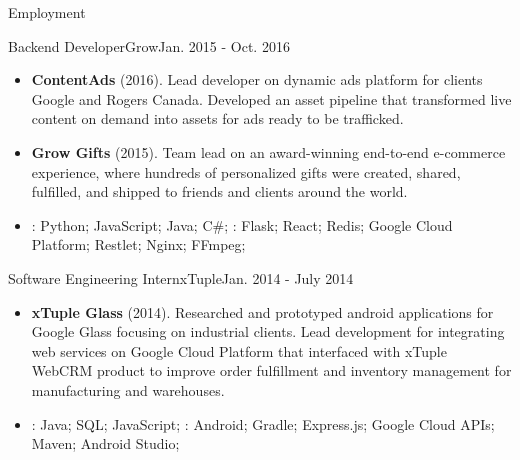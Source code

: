 \documentclass[]{mcdowellcv}
\begin{document}
\begin{cvsection}{Employment}
        \begin{cvsubsection}{Backend Developer}{Grow}{Jan. 2015 - Oct. 2016}
            \begin{itemize}
                \item \textbf{ContentAds} (2016). Lead developer on dynamic ads platform for clients Google and Rogers Canada. Developed an asset pipeline that transformed live content on demand into assets for ads ready to be trafficked.
            \end{itemize}
            \begin{itemize}
                \item \textbf{Grow Gifts} (2015). Team lead on an award-winning end-to-end e-commerce experience, where hundreds of personalized gifts were created, shared, fulfilled, and shipped to friends and clients around the world.
            \end{itemize}
            \begin{itemize}
                 \item {}: Python; JavaScript; Java; C\#; \newline
                : Flask; React; Redis; Google Cloud Platform; Restlet; Nginx; FFmpeg;
            \end{itemize}
        \end{cvsubsection}

        \begin{cvsubsection}{Software Engineering Intern}{xTuple}{Jan. 2014 - July 2014}
            \begin{itemize}
                \item \textbf{xTuple Glass} (2014). Researched and prototyped android applications for Google Glass focusing on industrial clients. Lead development for integrating web services on Google Cloud Platform that interfaced with xTuple WebCRM product to improve order fulfillment and inventory management for manufacturing and warehouses.
            \end{itemize}
            \begin{itemize}
                 \item {}: Java; SQL; JavaScript; \newline
                : Android; Gradle; Express.js; Google Cloud APIs; Maven; Android Studio;
            \end{itemize}
        \end{cvsubsection}
    \end{cvsection}
\end{document}
